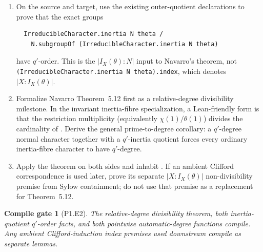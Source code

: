\documentclass[11pt]{article}
\newtheorem{gate}{Compile gate}
\begin{document}
\begin{enumerate}[label=\textbf{P1.E2.\arabic*.},leftmargin=*]
  \item On the source and target, use the existing outer-quotient
  declarations to prove that the exact groups
  \begin{lstlisting}
  IrreducibleCharacter.inertia N theta /
    N.subgroupOf (IrreducibleCharacter.inertia N theta)
  \end{lstlisting}
  have \(q'\)-order.  This is the \(|I_X(\theta):N|\) input to
  Navarro's theorem, not
  \texttt{(IrreducibleCharacter.inertia N theta).index}, which denotes
  \(|X:I_X(\theta)|\).
  \item Formalize Navarro Theorem~5.12 first as a relative-degree
  divisibility milestone.  In the invariant inertia-fibre specialization,
  a Lean-friendly form is that the restriction multiplicity (equivalently
  \(\chi(1)/\theta(1)\)) divides the cardinality of
  .  Derive the general
  prime-to-degree corollary: a \(q'\)-degree normal character together with
  a \(q'\)-inertia quotient forces every ordinary inertia-fibre character
  to have \(q'\)-degree.
  \item Apply the theorem on both sides and inhabit
  .
  If an ambient Clifford correspondence is used later, prove its separate
  \(|X:I_X(\theta)|\) non-divisibility premise from Sylow containment;
  do not use that premise as a replacement for Theorem~5.12.
\end{enumerate}

\begin{gate}[P1.E2]
The relative-degree divisibility theorem, both inertia-quotient
\(q'\)-order facts, and both pointwise automatic-degree functions compile.
Any ambient Clifford-induction index premises used downstream compile as
separate lemmas.
\end{gate}
\end{document}
